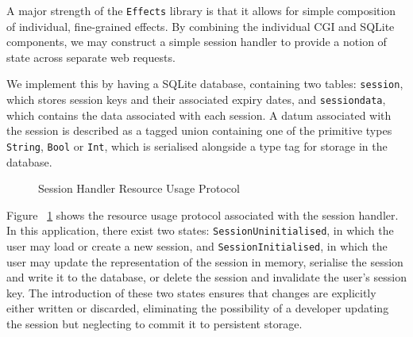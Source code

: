 \documentclass[preprint]{sigplanconf}
\begin{document}
A major strength of the \texttt{Effects} library is that it allows for simple composition of individual, fine-grained effects. By combining the individual CGI and SQLite components, we may construct a simple session handler to provide a notion of state across separate web requests. 

We implement this by having a SQLite database, containing two tables: \texttt{session}, which stores session keys and their associated expiry dates, and \texttt{sessiondata}, which contains the data associated with each session. A datum associated with the session is described as a tagged union containing one of the primitive types \texttt{String}, \texttt{Bool} or \texttt{Int}, which is serialised alongside a type tag for storage in the database.

\begin{figure}[htpb!]
\centering
{}
\caption{Session Handler Resource Usage Protocol}
\label{fig:sessionstates}
\end{figure}

Figure ~\ref{fig:sessionstates} shows the resource usage protocol associated with the session handler. In this application, there exist two states: \texttt{SessionUninitialised}, in which the user may load or create a new session, and \texttt{SessionInitialised}, in which the user may update the representation of the session in memory, serialise the session and write it to the database, or delete the session and invalidate the user's session key. The introduction of these two states ensures that changes are explicitly either written or discarded, eliminating the possibility of a developer updating the session but neglecting to commit it to persistent storage.
\end{document}
